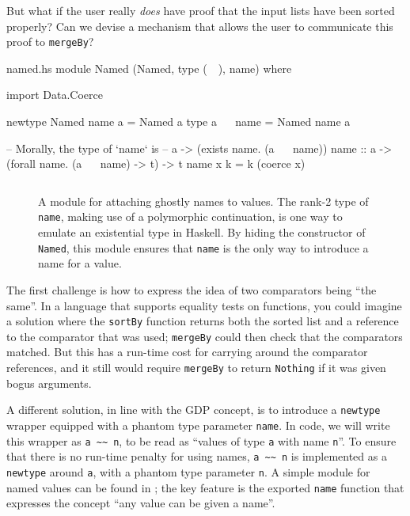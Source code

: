\documentclass[format=sigplan, review=false, screen=true, 10pt]{acmart}
\makeatletter
\let\origsubsection\subsection
\renewcommand\subsection{\@ifstar{\starsubsection}{\nostarsubsection}}
\newcommand\nostarsubsection[1]
{\subsectionprelude\origsubsection{#1}\subsectionpostlude}
\newcommand\starsubsection[1]
{\subsectionprelude\origsubsection*{#1}\subsectionpostlude}
\newcommand\subsectionprelude{%
  \vspace{-0.25em}
}
\newcommand\subsectionpostlude{%
  \vspace{-0.05em}
}
\makeatother
\begin{document}
But what if the user really \emph{does} have proof that the input lists have
been sorted properly? Can we devise a mechanism that allows the user to communicate
this proof to \texttt{mergeBy}?


\begin{filecontents*}{named.hs}
module Named (Named, type (~~), name) where

import Data.Coerce

newtype Named name a = Named a
type a ~~ name = Named name a

-- Morally, the type of `name` is
--      a -> (exists name. (a ~~ name))
name :: a -> (forall name. (a ~~ name) -> t) -> t
name x k = k (coerce x)
\end{filecontents*}
\begin{figure}
  \inputminted{haskell}{named.hs}
  \caption{A module for attaching ghostly names to values. The rank-2 type of \texttt{name},
    making use of a polymorphic continuation, is one way to emulate an existential type in
    Haskell. By hiding the constructor of \texttt{Named}, this module ensures that \texttt{name}
    is the only way to introduce a name for a value.
    \label{name-module}}
\end{figure}
\subsection{Conjuring a Name}

The first challenge is how to express the idea of two  comparators
being ``the same''. In a language that supports equality tests on functions,
you could imagine a solution where the \texttt{sortBy} function returns both the sorted
list and a reference to the comparator that was used; \texttt{mergeBy} could
then check that the comparators matched. But this has a run-time cost for carrying
around the comparator references, and it still would require \texttt{mergeBy} to
return \texttt{Nothing} if it was given bogus arguments.

A different solution, in line with the GDP concept, is to introduce a \texttt{newtype} wrapper equipped with
a phantom type parameter \texttt{name}.
In code, we will write this wrapper as \verb|a ~~ n|, to be read as
``values of type \texttt{a} with name \texttt{n}''. To ensure that there is no
run-time penalty for using names, \verb|a ~~ n| is implemented as a \texttt{newtype}
around \texttt{a}, with a phantom type parameter \texttt{n}. A simple module for named values
can be found in ; the key feature is the exported \texttt{name}
function that expresses the concept ``any value can be given a name''.
\end{document}
